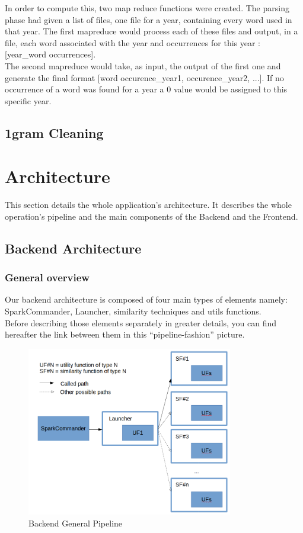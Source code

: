\documentclass{article}
\begin{document}
In order to compute this, two map reduce functions were created. The parsing phase had given a list of files, one file for a year, containing every word used in that year. The first mapreduce would process each of these files and output, in a file, each word associated with the year and occurrences for this year : [year\_word occurrences].\\

The second mapreduce would take, as input, the output of the first one and generate the final format [word occurence\_year1, occurence\_year2, ...]. If no occurrence of a word was found for a year a 0 value would be assigned to this specific year.

\subsection{1gram Cleaning}

\section{Architecture}
This section details the whole application's architecture. It describes the whole operation's pipeline and the main components of the Backend and the Frontend.
\subsection{Backend Architecture}

\subsubsection{General overview}
Our backend architecture is composed of four main types of elements namely: SparkCommander, Launcher, similarity techniques and utils functions.\\

Before describing those elements separately in greater details, you can find hereafter the link between them in this “pipeline-fashion” picture.

\begin{figure}[ht!]
\centering
\includegraphics[width=90mm]{reportBackendGeneralPipeline.png}
\caption{Backend General Pipeline \label{overflow}}
\end{figure}
\end{document}
